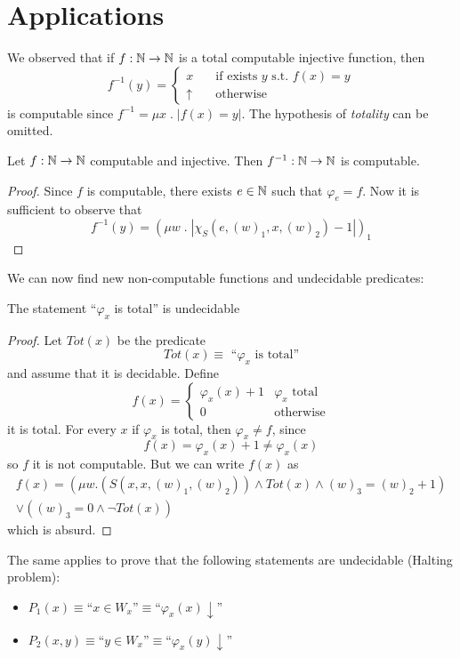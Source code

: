 \section{Applications}
We observed that if $f : \mathbb{N} \to \mathbb{N}$ is a total
computable injective function, then
\[
  f^{-1}(y) = \begin{cases}
    x & \quad \mbox{if exists $y$ s.t. } f(x) = y \\
    \uparrow & \quad \mbox{otherwise}
\end{cases}
\]
is computable since $f^{-1} = \mu x \; . \; |f(x) = y|$. 
The hypothesis of \emph{totality} can be omitted.
\begin{exercise}
  Let $f: \mathbb{N} \to \mathbb{N}$ computable and injective. Then
  $f^{-1}: \mathbb{N} \to \mathbb{N}$ is computable.
  \begin{proof}
    Since $f$ is computable, there exists $e \in \mathbb{N}$ such that $\varphi_e =
    f$. Now it is sufficient to observe that
    \[
f^{-1}(y) = (\mu w \; . \; |\chi_S(e, (w)_1, x, (w)_2) - 1|)_1
    \]
  \end{proof}
\end{exercise}

We can now find new non-computable functions and undecidable predicates:

\begin{exercise}
  The statement ``$\varphi_x$ is total'' is undecidable
  \begin{proof}
    Let $Tot(x)$ be the predicate
    \[ Tot(x) \equiv \mbox{ ``$\varphi_x$ is total''} \]
    and assume that it is decidable.
    Define
    \[
      f(x) = \begin{cases}
        \varphi_x (x) + 1 & \varphi_x \mbox{ total}\\
        0 & \mbox{otherwise}
      \end{cases}
    \]
    it is total.
    For every $x$ if $\varphi_x$ is total, then $\varphi_x \neq f$, since
    \[
    f(x) =   \varphi_x (x) + 1 \neq \varphi_x (x)
    \]
    so $f$ it is not computable.
    But we can write $f(x)$ as
    \begin{equation*}
      \begin{split}
        f(x) = (\mu w . (S(x,x,(w)_1,(w)_2)) \wedge Tot(x) \wedge (w)_3 = (w)_2 + 1) \\
        \vee ((w)_3 = 0 \wedge \lnot Tot(x))
      \end{split}
    \end{equation*}
    which is absurd.
  \end{proof}
\end{exercise}
\begin{observation}
The same applies to prove that the following
statements are undecidable (Halting problem):
\begin{itemize}
\item
  $P_1(x) \equiv \mbox{``}x \in W_x\mbox{''} \equiv
  \mbox{``}\varphi_x(x) \downarrow \mbox{''}$
\item
  $P_2(x,y) \equiv \mbox{``} y \in W_x \mbox{''} \equiv
  \mbox{``}\varphi_x(y) \downarrow\mbox{''}$
\end{itemize}
\end{observation}

